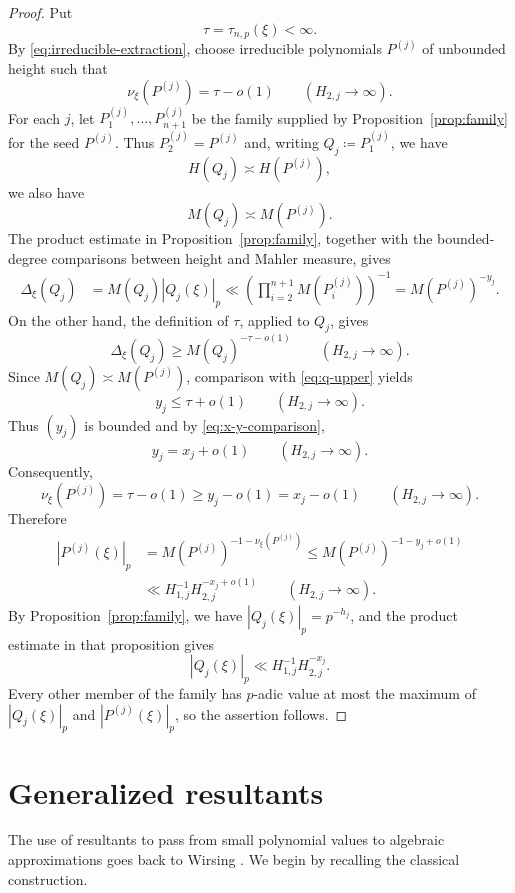 \documentclass[10pt,a4paper]{amsart}
\begin{document}
\begin{proof}
Put
$$
\tau=\tau_{n,p}(\xi)<\infty.
$$
By \eqref{eq:irreducible-extraction}, choose irreducible polynomials
$P^{(j)}$ of unbounded height such that
$$
\nu_\xi(P^{(j)})=\tau-o(1)\qquad(H_{2,j}\to\infty).
$$
For each $j$, let $P_1^{(j)},\ldots,P_{n+1}^{(j)}$ be the family supplied by
Proposition~\ref{prop:family} for the seed $P^{(j)}$. Thus
$P_2^{(j)}=P^{(j)}$ and, writing $Q_j\coloneqq P_1^{(j)}$, we have
$$
H(Q_j)\asymp H(P^{(j)}),
$$
we also have
$$
M(Q_j)\asymp M(P^{(j)}).
$$
The product estimate in Proposition~\ref{prop:family}, together with the bounded-degree comparisons between height and Mahler measure, gives
\begin{equation}\label{eq:q-upper}
\begin{aligned}
\Delta_\xi(Q_j)
&=M(Q_j)|Q_j(\xi)|_p \ll
\left(\prod_{i=2}^{n+1}M(P_i^{(j)})\right)^{-1}=M(P^{(j)})^{-y_j}.
\end{aligned}
\end{equation}
On the other hand, the definition of $\tau$, applied to $Q_j$, gives
$$
\Delta_\xi(Q_j)\geq M(Q_j)^{-\tau-o(1)}
\qquad(H_{2,j}\to\infty).
$$
Since $M(Q_j)\asymp M(P^{(j)})$, comparison with
\eqref{eq:q-upper} yields
$$
y_j\leq\tau+o(1)\qquad(H_{2,j}\to\infty).
$$
Thus $(y_j)$ is bounded and by \eqref{eq:x-y-comparison}, 
$$
y_j=x_j+o(1)\qquad(H_{2,j}\to\infty).
$$
Consequently,
$$
\nu_\xi(P^{(j)})=\tau-o(1)
\geq y_j-o(1)=x_j-o(1)
\qquad(H_{2,j}\to\infty).
$$
Therefore
$$
\begin{aligned}
|P^{(j)}(\xi)|_p
&=M(P^{(j)})^{-1-\nu_\xi(P^{(j)})}
\leq M(P^{(j)})^{-1-y_j+o(1)}\\
&\ll H_{1,j}^{-1}H_{2,j}^{-x_j+o(1)}
\qquad(H_{2,j}\to\infty).
\end{aligned}
$$
By Proposition~\ref{prop:family}, we have $|Q_j(\xi)|_p=p^{-h_j}$, and the
product estimate in that proposition gives
$$
|Q_j(\xi)|_p\ll H_{1,j}^{-1}H_{2,j}^{-x_j}.
$$
Every other member of the family has $p$-adic value at most the maximum of
$|Q_j(\xi)|_p$ and $|P^{(j)}(\xi)|_p$, so the assertion follows.
\end{proof}

\bigskip
\section{\bf Generalized resultants}
\bigskip

The use of resultants to pass from small polynomial values to algebraic
approximations goes back to Wirsing \cite{Wirsing}. We begin by recalling the
classical construction.
\end{document}
